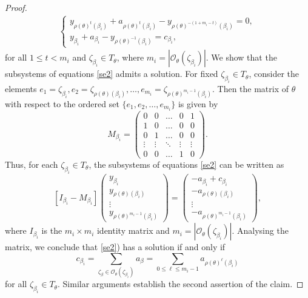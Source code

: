 \documentclass[10pt,a4paper]{amsart}
\begin{document}
\begin{proof}
\begin{align}
\begin{cases}
		y_{\rho(\theta)^t(\beta_i)}+a_{\rho(\theta)^t(\beta_i)}-y_{\rho(\theta)^{-(1+m_{i}-t)}(\beta_i)}=0,\\
		y_{\beta_i}+a_{\beta_i}-y_{\rho(\theta)^{-1}(\beta_i)}=c_{\beta_i},
	\end{cases}
\end{align}
for all $1\le t<m_{i}$ and $\zeta_{\beta_i}\in T_{\theta}$, where $m_{i}=|\mathcal{O}_{\theta}(\zeta_{\beta_i})|$.  We show that the subsystems of equations \eqref{se2} admits a solution. For fixed $\zeta_{\beta_i}\in T_{\theta}$, consider the elements $e_1=\zeta_{\beta_i},e_2=\zeta_{\rho(\theta)(\beta_i)},\dots,e_{m_{i}}=\zeta_{\rho(\theta)^{m_{i}-1}(\beta_i)}$. Then the  matrix of $\theta$ with respect to the ordered set $\{e_1,e_2,\dots,e_{m_i}\}$ is given by
$$M_{\beta_i}=
\left(\begin{matrix}	0&0&\ldots&0&1\\
	1&0&\ldots&0&0\\
	0&1&\ldots&0&0\\
	\vdots&\vdots&\ddots&\vdots&\vdots\\ 
	0&0&\ldots&1&0
\end{matrix}\right).
$$
Thus, for each $\zeta_{\beta_i}\in T_{\theta}$, the subsystems of equations \eqref{se2} can be written as
$$
[I_{\beta_i}-M_{\beta_i}]
\left(\begin{matrix}
	y_{\beta_i}\\
	y_{\rho(\theta)(\beta_i)}\\
	\vdots\\
	y_{\rho(\theta)^{m_{i}-1}(\beta_i)}
\end{matrix}\right)=
\left(\begin{matrix}	-a_{\beta_i}+c_{\beta_i}\\
	-a_{\rho(\theta)(\beta_i)}\\
	\vdots\\
	-a_{\rho(\theta)^{m_{i}-1}(\beta_i)}
\end{matrix}\right),
$$ 
where $I_{\beta_i}$ is the $m_{i}\times m_{i}$ identity matrix and $m_i=|\mathcal{O}_{\theta}(\zeta_{\beta_i})|$. Analysing the matrix, we conclude that \eqref{se2}) has a solution if and only if $$c_{\beta_i}=\sum_{\zeta_\beta\in\mathcal{O}_{\theta}(\zeta_{\beta_i})}{a_\beta}=\sum_{0 \le \ell \le m_{i}-1} a_{\rho(\theta)^\ell(\beta_i)}$$ for all $\zeta_{\beta_i}\in T_{\theta}$. Similar arguments establish the second assertion of the claim. 
\par


\end{proof}
\end{document}
